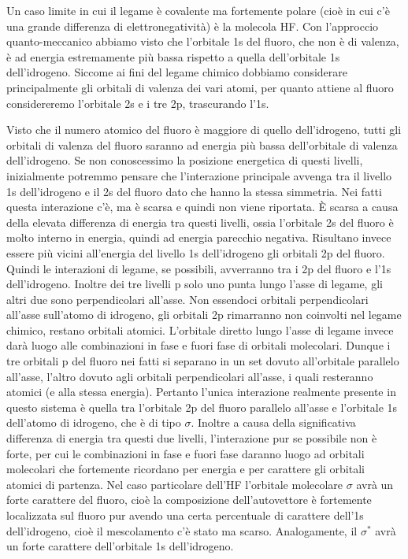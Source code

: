 Un caso limite in cui il legame è covalente ma fortemente polare (cioè in cui c'è una grande differenza di elettronegatività) è la molecola HF. Con l'approccio quanto-meccanico abbiamo visto che l'orbitale 1s del fluoro, che non è di valenza, è ad energia estremamente più bassa rispetto a quella dell'orbitale 1s dell'idrogeno. Siccome ai fini del legame chimico dobbiamo considerare principalmente gli orbitali di valenza dei vari atomi, per quanto attiene al fluoro considereremo l'orbitale 2s e i tre 2p, trascurando l'1s.

Visto che il numero atomico del fluoro è maggiore di quello dell'idrogeno, tutti gli orbitali di valenza del fluoro saranno ad energia più bassa dell'orbitale di valenza dell'idrogeno. Se non conoscessimo la posizione energetica di questi livelli, inizialmente potremmo pensare che l'interazione principale avvenga tra il livello 1s dell'idrogeno e il 2s del fluoro dato che hanno la stessa simmetria. Nei fatti questa interazione c'è, ma è scarsa e quindi non viene riportata. È scarsa a causa della elevata differenza di energia tra questi livelli, ossia l'orbitale 2s del fluoro è molto interno in energia, quindi ad energia parecchio negativa. Risultano invece essere più vicini all'energia del livello 1s dell'idrogeno gli orbitali 2p del fluoro. Quindi le interazioni di legame, se possibili, avverranno tra i 2p del fluoro e l'1s dell'idrogeno. Inoltre dei tre livelli p solo uno punta lungo l'asse di legame, gli altri due sono perpendicolari all'asse. Non essendoci orbitali perpendicolari all'asse sull'atomo di idrogeno, gli orbitali 2p rimarranno non coinvolti nel legame chimico, restano orbitali atomici. L'orbitale diretto lungo l'asse di legame invece darà luogo alle combinazioni in fase e fuori fase di orbitali molecolari. Dunque i tre orbitali p del fluoro nei fatti si separano in un set dovuto all'orbitale parallelo all'asse, l'altro dovuto agli orbitali perpendicolari all'asse, i quali resteranno atomici (e alla stessa energia). Pertanto l'unica interazione realmente presente in questo sistema è quella tra l'orbitale 2p del fluoro parallelo all'asse e l'orbitale 1s dell'atomo di idrogeno, che è di tipo $\sigma$. Inoltre a causa della significativa differenza di energia tra questi due livelli, l'interazione pur se possibile non è forte, per cui le combinazioni in fase e fuori fase daranno luogo ad orbitali molecolari che fortemente ricordano per energia e per carattere gli orbitali atomici di partenza. Nel caso particolare dell'HF l'orbitale molecolare $\sigma$ avrà un forte carattere del fluoro, cioè la composizione dell'autovettore è fortemente localizzata sul fluoro pur avendo una certa percentuale di carattere dell'1s dell'idrogeno, cioè il mescolamento c'è stato ma scarso. Analogamente, il $\sigma^*$ avrà un forte carattere dell'orbitale 1s dell'idrogeno.

